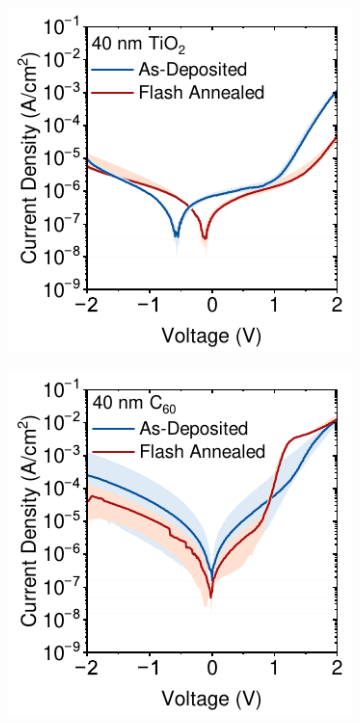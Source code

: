 \begin{figure}[htbp]
    \centering
    \begin{subfigure}[t]{0.45\textwidth}
        \centering
        \includegraphics[width=\textwidth]{chapters/material_properties/images/TiO2-Compare.pdf} 
        \caption{}
        \label{fig:ch2:tio2_compare}
    \end{subfigure}
    \hfill
    \begin{subfigure}[t]{0.45\textwidth}
        \centering
        \includegraphics[width=\textwidth]{chapters/material_properties/images/C60-Compare.pdf} %
        \caption{}
        \label{fig:ch2:c60_compare}
    \end{subfigure}


\end{figure}
